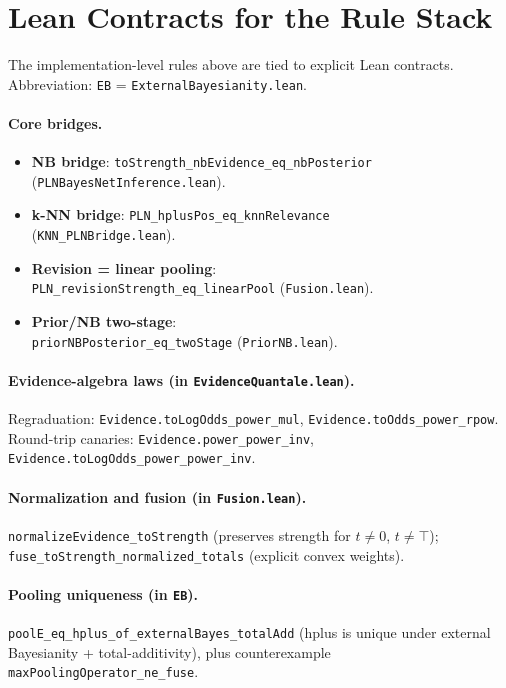 \documentclass[11pt]{article}
\newcommand{\lpath}[1]{\texttt{\nolinkurl{#1}}}
\newcommand{\lid}[1]{{\ttfamily\nolinkurl{#1}}}
\begin{document}
\section{Lean Contracts for the Rule Stack}
The implementation-level rules above are tied to explicit Lean contracts.
Abbreviation: \texttt{EB} = \lpath{ExternalBayesianity.lean}.

\paragraph{Core bridges.}
\begin{itemize}
\item \textbf{NB bridge}: \lid{toStrength_nbEvidence_eq_nbPosterior}\\
      (\lpath{PLNBayesNetInference.lean}).
\item \textbf{k-NN bridge}: \lid{PLN_hplusPos_eq_knnRelevance}\\
      (\lpath{KNN_PLNBridge.lean}).
\item \textbf{Revision = linear pooling}:\\
      \lid{PLN_revisionStrength_eq_linearPool}
      (\lpath{Fusion.lean}).
\item \textbf{Prior/NB two-stage}:\\
      \lid{priorNBPosterior_eq_twoStage}
      (\lpath{PriorNB.lean}).
\end{itemize}

\paragraph{Evidence-algebra laws (in \lpath{EvidenceQuantale.lean}).}
Regraduation: \lid{Evidence.toLogOdds_power_mul},
\lid{Evidence.toOdds_power_rpow}.
Round-trip canaries: \lid{Evidence.power_power_inv},
\lid{Evidence.toLogOdds_power_power_inv}.

\paragraph{Normalization and fusion (in \lpath{Fusion.lean}).}
\lid{normalizeEvidence_toStrength} (preserves strength for $t\neq 0$, $t\neq\top$);
\lid{fuse_toStrength_normalized_totals} (explicit convex weights).

\paragraph{Pooling uniqueness (in \texttt{EB}).}
\lid{poolE_eq_hplus_of_externalBayes_totalAdd} (hplus is unique under
external Bayesianity + total-additivity),
plus counterexample \lid{maxPoolingOperator_ne_fuse}.
\end{document}
